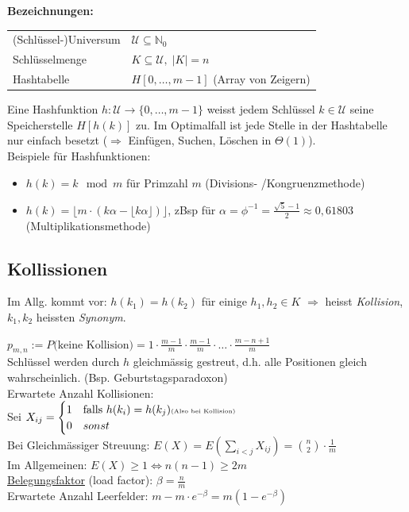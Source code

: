 \documentclass{scrartcl}
\begin{document}
\begin{shaded}
\textbf{Bezeichnungen:} \\
\begin{tabular}{ll}
(Schlüssel-)Universum &$\mathcal{U} \subseteq \mathds{N}_0$ \\ 
Schlüsselmenge & $K \subseteq \mathcal{U}, \; \vert K \vert = n$ \\ 
Hashtabelle & $H[0,\ldots, m-1]$ (Array von Zeigern) \\ 
\end{tabular} 
\end{shaded}
Eine Hashfunktion $h: \mathcal{U} \to \{0,\ldots,m-1\}$ weisst jedem Schlüssel $k\in\mathcal{U}$ seine Speicherstelle $H[h(k)]$ zu. Im Optimalfall ist jede Stelle in der Hashtabelle nur einfach besetzt ($\Rightarrow$ Einfügen, Suchen, Löschen in $\Theta(1)$). \\
Beispiele für Hashfunktionen:
\begin{itemize}
	\item $h(k) = k \mod m$ \; für Primzahl $m$ (Divisions- /Kongruenzmethode)
	\item $h(k) = \lfloor m\cdot(k\alpha-\lfloor k\alpha\rfloor)\rfloor$, zBsp für $\alpha=\phi^{-1}=\frac{\sqrt{5}-1}{2}\approx 0,61803$ \; (Multiplikationsmethode)
\end{itemize}

\subsection{Kollissionen}
Im Allg. kommt vor: $h(k_1)=h(k_2)$ für einige $h_1,h_2\in K$ $\Rightarrow$ heisst \emph{Kollision}, $k_1,k_2$ heissten \emph{Synonym}.
\begin{shaded}
$p_{m,n} := P \textrm{(keine Kollision)} = 1\cdot\frac{m-1}{m}\cdot\frac{m-1}{m}\cdot\ldots\cdot\frac{m-n+1}{m}$ \\
Schlüssel werden durch $h$ gleichmässig gestreut, d.h. alle Positionen gleich wahrscheinlich. (Bsp. Geburtstagsparadoxon) \\ \vspace{2em}
Erwartete Anzahl Kollisionen: \\
Sei $X_{ij}=
\begin{cases} 
1 & \textrm{falls } h(k_i)=h(k_j) \textrm{\tiny (Also bei Kollision)} \\
0 & sonst
\end{cases}$\\
Bei Gleichmässiger Streuung: $E(X)=E\left(\sum_{i<j}X_{ij}\right)=\binom{n}{2}\cdot\frac{1}{m}$ \\
Im Allgemeinen: $E(X)\geq 1 \Leftrightarrow n(n-1)\geq 2m$ \\ \vspace{2em}
\underline{Belegungsfaktor} (load factor): $\beta = \frac{n}{m}$\\
Erwartete Anzahl Leerfelder: $m-m\cdot e^{-\beta} = m(1-e^{-\beta})$
\end{shaded}
\end{document}
